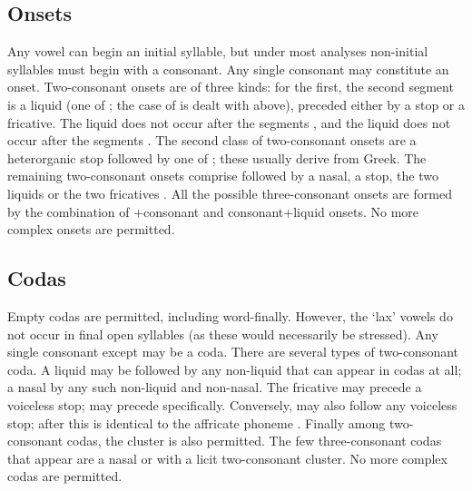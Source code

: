 \subsection{Onsets}
Any vowel can begin an initial syllable, but under most analyses non-initial syllables must begin with a consonant.
Any single consonant may constitute an onset. Two-consonant onsets are of three kinds: for the first, the second segment is a liquid (one of ; the case of  is dealt with above), preceded either by a stop or a fricative. The liquid  does not occur after the segments , and the liquid  does not occur after the segments .
The second class of two-consonant onsets are a heterorganic stop followed by one of ; these usually derive from Greek.
The remaining two-consonant onsets comprise  followed by a nasal, a stop, the two liquids  or the two fricatives .
All the possible three-consonant onsets are formed by the combination of +consonant and consonant+liquid onsets.
No more complex onsets are permitted.
\subsection{Codas}
Empty codas are permitted, including word-finally. However, the `lax' vowels  do not occur in final open syllables (as these would necessarily be stressed).
Any single consonant except  may be a coda. There are several types of two-consonant coda. A liquid may be followed by any non-liquid that can appear in codas at all; a nasal by any such non-liquid and non-nasal.
The fricative  may precede a voiceless stop;  may precede  specifically.
Conversely,  may also follow any voiceless stop; after  this is identical to the affricate phoneme .
Finally among two-consonant codas, the cluster  is also permitted.
The few three-consonant codas that appear are a nasal or  with a licit two-consonant cluster.
No more complex codas are permitted.

